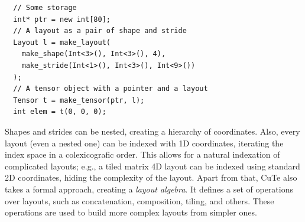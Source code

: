 \begin{verbatim}
  // Some storage
  int* ptr = new int[80];
  // A layout as a pair of shape and stride
  Layout l = make_layout(
    make_shape(Int<3>(), Int<3>(), 4),
    make_stride(Int<1>(), Int<3>(), Int<9>())
  );
  // A tensor object with a pointer and a layout
  Tensor t = make_tensor(ptr, l);
  int elem = t(0, 0, 0);
\end{verbatim}

Shapes and strides can be nested, creating a hierarchy of coordinates. Also, every layout (even a nested one) can be indexed with 1D coordinates, iterating the index space in a colexicografic order. This allows for a natural indexation of complicated layouts; e.g., a tiled matrix 4D layout can be indexed using standard 2D coordinates, hiding the complexity of the layout.
Apart from that, CuTe also takes a formal approach, creating a \emph{layout algebra}. It defines a set of operations over layouts, such as concatenation, composition, tiling, and others. These operations are used to build more complex layouts from simpler ones.





